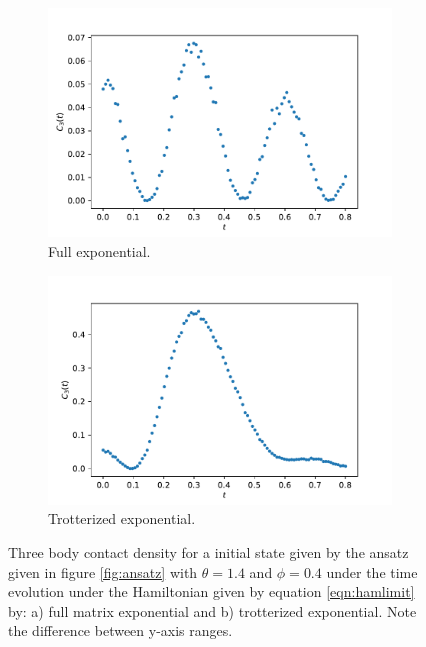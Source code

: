 \documentclass[10 pt, a4paper]{article}
\begin{document}
\begin{figure}[H]
\centering
\begin{subfigure}{.49\textwidth}
  \centering
  \includegraphics[width=\linewidth]{ExactSingle}
  \caption{Full exponential.}
  \label{fig:fullexp}
\end{subfigure}
\begin{subfigure}{.49\textwidth}
  \centering
  \includegraphics[width=\linewidth]{ExactProductSingle}
  \caption{Trotterized exponential.}
  \label{fig:sub2}
\end{subfigure}
\caption{Three body contact density for a initial state given by the ansatz given in figure \ref{fig:ansatz} with $\theta = 1.4$ and $\phi = 0.4$ under the time evolution under the Hamiltonian given by equation \ref{eqn:hamlimit} by: a) full matrix exponential and b) trotterized exponential.  Note the difference between y-axis ranges.}
\end{figure}
\end{document}
